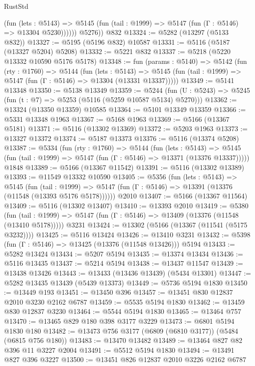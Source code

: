 \begin{lexlean}{RustStd}
\begin{coremodule}
{\begin{coremodule}
{{{{{{{{{{{{{{{{{{{{{{{{{{{{{{{              (fun (lets : @5143) =>
              @5145 (fun (tail : @1999) => @5147 (fun (Γ : @5146) => @13304 @5230))))))
        @5276))
    @832
@13324 := @5282 (@13297 (@5133 @832))
@13327 := @5195 (@5196 @832) @10587
@13331 := @5116 (@5187 (@13327 @5204) @5208)
@13332 := @5221 @832
@13337 := @5218 (@5220 @13332 @10590 @5176 @5178)
@13348 := fun (params : @5140) =>
  @5142
    (fun (rty : @1760) =>
    @5144
      (fun (lets : @5143) =>
      @5145 (fun (tail : @1999) => @5147 (fun (Γ : @5146) => @13304 (@13331 @13337)))))
@13349 := @5141 @13348
@13350 := @5138 @13349
@13359 := @5244
    (fun (U : @5243) => @5245 (fun (t : @7) => @5253 (@5116 (@5259 @10587 @5134) @5270)))
@13362 := @13324 (@13350 @13359) @10585
@13364 := @5101 @13349 @13359
@13366 := @5331 @13348 @1963
@13367 := @5168 @1963
@13369 := @5166 (@13367 @5181)
@13371 := @5116 (@13302 @13369)
@13372 := @5203 @1963
@13373 := @13327 @13372
@13374 := @5187 @13373
@13376 := @5116 (@13374 @5208)
@13387 := @5334
    (fun (rty : @1760) =>
    @5144
      (fun (lets : @5143) =>
      @5145 (fun (tail : @1999) => @5147 (fun (Γ : @5146) => @13371 (@13376 @13337)))))
    @1848
@13389 := @5166 (@13367 @11542)
@13391 := @5116 (@13302 @13389)
@13393 := @11549 @13332 @10590
@13405 := @5356
    (fun (lets : @5143) =>
    @5145
      (fun (tail : @1999) =>
      @5147 (fun (Γ : @5146) => @13391 (@13376 (@11548 (@13393 @5176 @5178))))))
    @2010
@13407 := @5166 (@13367 @11564)
@13409 := @5116 (@13302 @13407)
@13410 := @13393 @2010
@13419 := @5380
    (fun (tail : @1999) => @5147 (fun (Γ : @5146) => @13409 (@13376 (@11548 (@13410 @5178)))))
    @3231
@13424 := @13302 (@5166 (@13367 (@11541 (@5175 @3232))))
@13425 := @5116 @13424
@13426 := @13410 @3231
@13432 := @5398 (fun (Γ : @5146) => @13425 (@13376 (@11548 @13426))) @5194
@13433 := @5282 @13424
@13434 := @5207 @5194
@13435 := @13374 @13434
@13436 := @5116 @13435
@13437 := @5214 @5194
@13438 := @13437 @11547
@13439 := @13438 @13426
@13443 := @13433 (@13436 @13439) (@5434 @13301)
@13447 := @5282 @13435 @13439 (@5439 @13373)
@13449 := @5736 @5194 @1830
@13450 := @13449 @193
@13451 := @13450 @396
@13457 := @13451 @830 @12837 @2010 @3230 @2162 @6787
@13459 := @5535 @5194 @1830
@13462 := @13459 @830 @12837 @3230
@13464 := @5544 @5194 @1830
@13465 := @13464 @757
@13470 := @13465 @829 @180 @398 @3177 @3229
@13473 := @6801 @5194 @1830 @180
@13482 := @13473 @756 @3177 (@6809 (@6810 @3177)) (@5484 (@6815 @756 @180))
@13483 := @13470 @13482
@13489 := @13464 @827 @82 @396 @11 @3227 @2004
@13491 := @5512 @5194 @1830
@13494 := @13491 @827 @396 @3227
@13500 := @13451 @826 @12837 @2010 @3226 @2162 @6787
}}}}}}}}}}}}}}}}}}}}}}}}}}}}}}}
\end{coremodule}}
\end{coremodule}
\end{lexlean}
